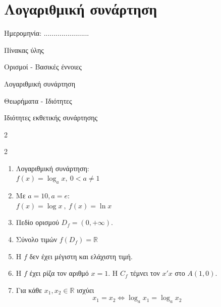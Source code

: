 \documentclass[twoside,nofonts,internet,math,spyros]{frontisthrio}
\begin{document}
\section{Λογαριθμική συνάρτηση}
\begin{flushright}
\faCalendar* Ημερομηνία: .......................
\end{flushright}
\begin{mybox}[mysubtitle]{Πίνακας ύλης}
\begin{tcbraster}[raster columns=2,raster equal height]
\begin{myleftbox}{Ορισμοί - Βασικές έννοιες\ \ \faBook}
\begin{arithmisi}[itemsep=0mm]
\item Λογαριθμική συνάρτηση

\end{arithmisi}
\end{myleftbox}
\begin{myrightbox}{Θεωρήματα - Ιδιότητες\ \ \faTools}
\begin{arithmisi}[itemsep=0mm]
\item Ιδιότητες εκθετικής συνάρτησης
\end{arithmisi}
\end{myrightbox}
\end{tcbraster}
\begin{multicols}{2}
\begin{todolist}[itemsep=0mm]
\item 
\end{todolist}
\end{multicols}
\begin{multicols}{2}
\begin{enumerate}[itemsep=0mm,leftmargin=3mm]
\item Λογαριθμική συνάρτηση:\\$ f(x)=\log_{a}{x},\ 0<a\neq 1 $
\item Με $ a=10,a=e $:\\$ f(x)=\log{x}\ ,\ f(x)=\ln{x} $
\item Πεδίο ορισμού $ D_f=(0,+\infty) $.
\item Σύνολο τιμών $ f(D_f)=\mathbb{R} $
\item Η $ f $ δεν έχει μέγιστη και ελάχιστη τιμή.
\item Η $ f $ έχει ρίζα τον αριθμό $ x=1 $. Η $ C_f $ τέμνει τον $ x'x $ στο $ A(1,0) $.
\item Για κάθε $ x_1,x_2\in\mathbb{R} $ ισχύει \[ x_1=x_2\Leftrightarrow \log_{a}{x_1}=\log_{a}{x_2} \]

\end{enumerate}
\end{multicols}
\end{mybox}
\end{document}
